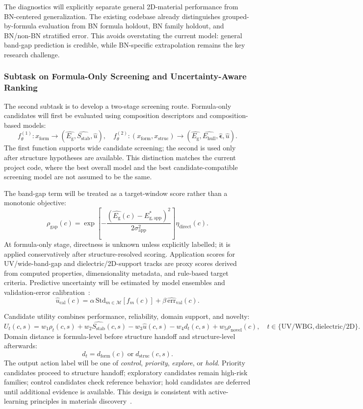 \documentclass[10pt,a4paper]{article}
\newcommand{\eg}{E_{\mathrm{g}}}
\newcommand{\ehull}{E_{\mathrm{hull}}}
\newcommand{\form}{x_{\mathrm{form}}}
\newcommand{\struc}{x_{\mathrm{struc}}}
\newcommand{\unc}{u}
\newcommand{\stab}{S_{\mathrm{stab}}}
\newcommand{\domainf}{d_{\mathrm{form}}}
\newcommand{\domains}{d_{\mathrm{struc}}}
\newcommand{\utility}{U}
\newcommand{\gapscore}{\rho_{\mathrm{gap}}}
\newcommand{\novel}{\rho_{\mathrm{novel}}}
\begin{document}
The diagnostics will explicitly separate general 2D-material performance from BN-centered generalization. The existing codebase already distinguishes grouped-by-formula evaluation from BN formula holdout, BN family holdout, and BN/non-BN stratified error. This avoids overstating the current model: general band-gap prediction is credible, while BN-specific extrapolation remains the key research challenge.

\subsubsection{Subtask on Formula-Only Screening and Uncertainty-Aware Ranking}
The second subtask is to develop a two-stage screening route. Formula-only candidates will first be evaluated using composition descriptors and composition-based models:
\[
  f_{\theta}^{(1)}:\form\rightarrow(\hat{\eg},\hat{\stab},\hat{\unc}),
  \quad
  f_{\theta}^{(2)}:(\form,\struc)\rightarrow
  (\hat{\eg},\hat{\ehull},\hat{\boldsymbol{\epsilon}},\hat{\unc}).
\]
The first function supports wide candidate screening; the second is used only after structure hypotheses are available. This distinction matches the current project code, where the best overall model and the best candidate-compatible screening model are not assumed to be the same.

The band-gap term will be treated as a target-window score rather than a monotonic objective:
\[
  \gapscore(c)=
  \exp\!\left[-\frac{(\hat{\eg}(c)-E^*_{\mathrm{g,app}})^2}{2\sigma_{\mathrm{app}}^2}\right]\eta_{\mathrm{direct}}(c).
\]
At formula-only stage, directness is unknown unless explicitly labelled; it is applied conservatively after structure-resolved scoring. Application scores for UV/wide-band-gap and dielectric/2D-support tracks are proxy scores derived from computed properties, dimensionality metadata, and rule-based target criteria. Predictive uncertainty will be estimated by model ensembles and validation-error calibration~\cite{gal2016_dropout,lakshminarayanan2017_ensembles}:
\[
  \hat{\unc}_{\mathrm{cal}}(c)=
  \alpha\,\mathrm{Std}_{m\in\mathcal{M}}[f_m(c)]
  +\beta\,\widehat{\mathrm{err}}_{\mathrm{val}}(c).
\]

Candidate utility combines performance, reliability, domain support, and novelty:
\[
  \utility_t(c,s)=w_1\rho_t(c,s)+w_2\hat{\stab}(c,s)-w_3\hat{\unc}(c,s)
  -w_4 d_t(c,s)+w_5\novel(c),
  \quad t\in\{\mathrm{UV/WBG},\mathrm{dielectric/2D}\}.
\]
Domain distance is formula-level before structure handoff and structure-level afterwards:
\[
  d_t=\domainf(c)\;\mathrm{or}\;\domains(c,s).
\]
The output action label will be one of \textit{control}, \textit{priority}, \textit{explore}, or \textit{hold}. Priority candidates proceed to structure handoff; exploratory candidates remain high-risk families; control candidates check reference behavior; hold candidates are deferred until additional evidence is available. This design is consistent with active-learning principles in materials discovery~\cite{lookman2019_active}.
\end{document}
